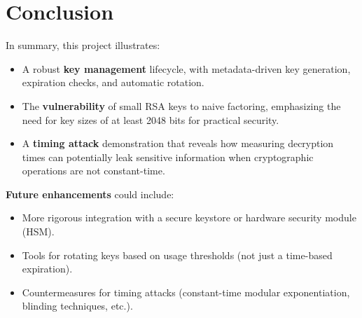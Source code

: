 \documentclass[12pt]{article}
\begin{document}
\section{Conclusion}

In summary, this project illustrates:
\begin{itemize}
    \item A robust \textbf{key management} lifecycle, with metadata-driven key generation, expiration checks, and automatic rotation.
    \item The \textbf{vulnerability} of small RSA keys to naive factoring, emphasizing the need for key sizes of at least 2048 bits for practical security.
    \item A \textbf{timing attack} demonstration that reveals how measuring decryption times can potentially leak sensitive information when cryptographic operations are not constant-time.
\end{itemize}

\noindent
\textbf{Future enhancements} could include:
\begin{itemize}
    \item More rigorous integration with a secure keystore or hardware security module (HSM).
    \item Tools for rotating keys based on usage thresholds (not just a time-based expiration).
    \item Countermeasures for timing attacks (constant-time modular exponentiation, blinding techniques, etc.).
\end{itemize}
\end{document}
